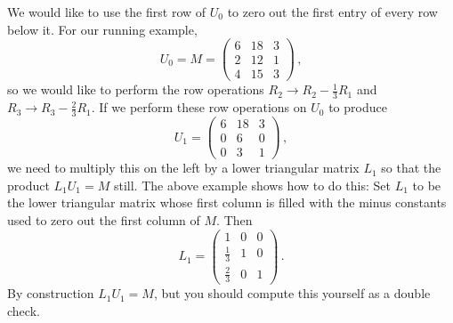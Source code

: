 \vspace{2mm}
We would like to  use the first row of $U_0$ to zero out the first entry of every row below it.  For our running example, $$U_0=M=\begin{pmatrix}
6 & 18 & 3 \\
2 & 12 & 1 \\
4 & 15 & 3 
\end{pmatrix}\, ,$$ so we would like to perform the row operations $R_2\to R_2 -\frac 13 R_1$ and $R_3\to R_3-\frac 23R_1$.
If we perform these row operations on $U_0$ to produce 
$$U_1=\begin{pmatrix}
6 & 18 & 3 \\
0 & 6 & 0 \\
0 & 3 & 1 
\end{pmatrix}\, ,$$
we need to multiply this on the left by a lower triangular matrix $L_1$ so that the product $L_1U_1=M$ still.
The above example shows how to do this:
Set $L_1$ to be the lower triangular matrix whose first column is filled with the minus constants used to zero out the first column of $M$.  Then $$L_1 = \begin{pmatrix}
1 & 0 & 0 \\[1mm]
\frac{1}{3} & 1 & 0 \\[1mm]
\frac{2}{3} & 0 & 1 
\end{pmatrix}\, .$$  
By construction $L_1 U_1=M$, but you should compute this yourself as a double check.


